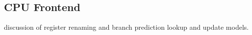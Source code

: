\subsection{CPU Frontend}
\label{sec:cpu_frontend}

discussion of register renaming and branch prediction lookup and update models.

% 
